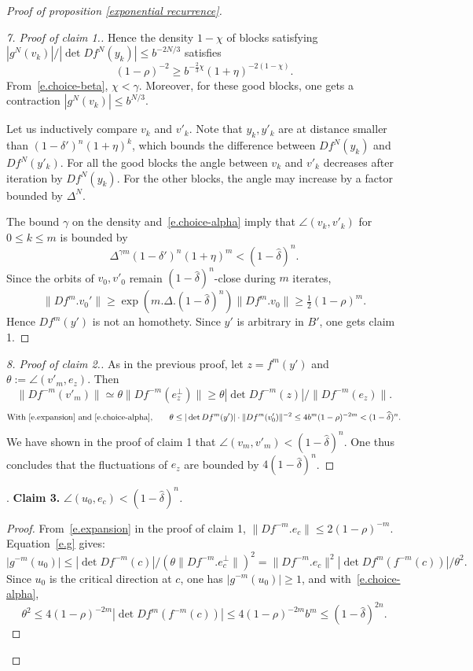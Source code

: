 \documentclass[a4paper,11pt]{article}
\theoremstyle{definition}
\begin{document}
\begin{proof}[Proof of proposition \ref{exponential recurrence}]
\begin{proof}[{\rm 7.} Proof of claim 1.]
\noindent
Hence the density $1-\chi$ of blocks satisfying $|g^N(v_k)|/|\det Df^N(y_k)|\leq b^{-2N/3}$ satisfies
$$ (1-\rho)^{-2}\geq b^{-\tfrac 2 3\chi}(1+\eta)^{-2(1-\chi)}.$$
From~\eqref{e.choice-beta}, $\chi<\gamma$.
Moreover, for these good blocks, one gets a contraction $|g^N(v_k)|\leq b^{N/3}$.\hspace{-1cm}\mbox{}
\medskip

\noindent
Let us inductively compare $v_k$ and $v'_k$.
Note that $y_k,y'_k$ are at distance smaller than $(1-\delta')^n(1+\eta)^k$, which bounds the difference between
$Df^N(y_k)$ and $Df^N(y'_k)$.
For all the good blocks the angle between $v_k$ and $v'_k$ decreases after iteration by $Df^N(y_k)$.
For the other blocks, the angle may increase by a factor bounded by $\Delta^N$.
\medskip

\noindent
The bound $\gamma$ on the density and~\eqref{e.choice-alpha} imply that $\angle(v_k,v'_k)$ for $0\leq k\leq m$ is bounded by
$$\Delta^{\gamma m}(1-\delta')^n(1+\eta)^m<(1-\widehat \delta)^n.$$
Since the orbits of $v_0,v'_0$ remain $(1-\widehat \delta)^n$-close during $m$ iterates,
\begin{equation}\label{e.expansion}
\|Df^m.v_0'\|\geq \exp(m.\Delta.(1-\widehat \delta)^n)\|Df^m.v_0\|\geq \tfrac 1 2 (1-\rho)^m.
\end{equation}
Hence $Df^m(y')$ is not an homothety. Since $y'$ is arbitrary in $B'$, one gets claim 1.
\end{proof}
\medskip

\begin{proof}[{\rm 8.} Proof of claim 2.]
As in the previous proof, let $z=f^m(y')$ and $\theta:=\angle(v'_m,e_{z})$. Then
$$\|Df^{-m}(v'_m)\|\simeq \theta \|Df^{-m}(e^\perp_{z})\|\geq \theta |\det Df^{-m}(z)|/\|Df^{-m}(e_{z})\|.$$
$$\text{With~\eqref{e.expansion} and~\eqref{e.choice-alpha},}\qquad \theta\leq |\det Df^{m}(y')|\cdot \|Df^{m}(v'_0)\|^{-2}\leq 4b^m (1-\rho)^{-2m}
<(1-\widehat \delta)^n.$$
We have shown in the proof of claim 1 that $\angle(v_m,v'_m)<(1-\widehat \delta)^n$.
One thus concludes that the fluctuations of $e_z$ are bounded by $4 (1-\widehat \delta)^n$.
\end{proof}
\bigskip

. {\bf Claim 3.} \emph{$\angle(u_0,e_c)<(1-\widehat \delta)^n$.}
\begin{proof}
From~\eqref{e.expansion} in the proof of claim 1, $\|Df^{-m}.e_c\|\leq 2(1-\rho)^{-m}$.
Equation~\eqref{e.g} gives:
$$|g^{-m}(u_0)|\leq |\det Df^{-m}(c)|/(\theta\|Df^{-m}.e_c^\perp\|)^2=\|Df^{-m}.e_c\|^2|\det Df^{m}(f^{-m}(c))|/\theta^2 .$$
Since $u_0$ is the critical direction at $c$, one has $|g^{-m}(u_0)|\geq 1$, and with~\eqref{e.choice-alpha},
\begin{equation*}\theta^2\leq 4(1-\rho)^{-2m}|\det Df^{m}(f^{-m}(c))|\leq 4(1-\rho)^{-2m}b^m\leq (1-\widehat \delta)^{2n}.\tag*{\qedhere}
\end{equation*}
\end{proof}
\bigskip


\end{proof}
\end{document}
